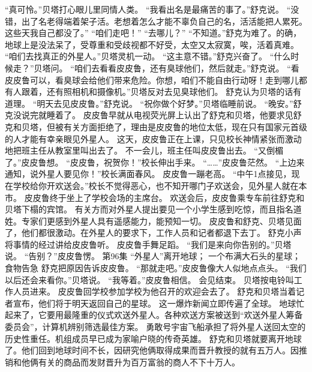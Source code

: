 \documentclass[a4paper,12pt,UTF8,twoside]{ctexbook}
\begin{document}
        “真可怜。”贝塔打心眼儿里同情人类。 
        “我看出名是最痛苦的事了。”舒克说。 
        “没错，出了名老得端着架子活。老想着怎么才能不辜负自己的名，活活能把人累死。这些天我自己都没了。” 
        “咱们走吧！” 
        “去哪儿？” 
        “不知道。”舒克为难了。的确，地球上是没法呆了，受尊重和受歧视都不好受，太空又太寂寞，唉，活着真难。 
        “咱们去找真正的外星人。”贝塔灵机一动。 
        “这主意不错。”舒克兴奋了。 
        “什么时候走？”贝塔问。 
        “咱们去看看皮皮鲁，还有臭球他们，然后就走。”舒克说。 
        “看皮皮鲁可以，看臭球会给他们带来危险。你想，咱们不能自由行动呀！走到哪儿都有人跟着，还有照相机和摄像机。”贝塔反对去见臭球他们。 
        舒克认为贝塔的话有道理。 
        “明天去见皮皮鲁。”舒克说。 
        “祝你做个好梦。”贝塔临睡前说。 
        “晚安。”舒克没说完就睡着了。 
        皮皮鲁早就从电视荧光屏上认出了舒克和贝塔，他要求见舒克和贝塔，但被有关方面拒绝了，理由是皮皮鲁的地位太低，现在只有国家元首级的人才能有幸亲眼见外星人。 
        这天，皮皮鲁正在上课，只见校长神情紧张而激动地把班主任从教室里叫出去了。 
        不一会儿，班主任叫皮皮鲁出去。 
        “又倒楣了。”皮皮鲁想。 
        “皮皮鲁，祝贺你！”校长伸出手来。 
        “……”皮皮鲁茫然。 
        “上边来通知，说外星人要见你！”校长满面春风。 
        皮皮鲁一蹦老高。 
        “中午1点接见，现在学校给你开欢送会。”校长不觉得恶心，也不知开哪门子欢送会，见外星人就在本市。 
        皮皮鲁终于坐上了学校会场的主席台。 
        欢送会后，皮皮鲁乘专车前往舒克和贝塔下榻的宾馆。 
        有关方而对外星人提出要见一个小学生感到吃惊，而且指名道姓。专家们更感到外星人具有遥感能力，能预知一切。 
        皮皮鲁和舒克、贝塔见面了，他们都很激动。在外星人的要求下，工作人员和记者都退下去丁。 
        舒克小声将事情的经过讲给皮皮鲁听。 
        皮皮鲁手舞足蹈。 
        “我们是来向你告别的。”贝塔说。 
        “告别？”皮皮鲁愣。   第96集 
        “外星人”离开地球； 
        一个布满大石头的星球； 
        食物告急   
        舒克把原因告诉皮皮鲁。 
        “那就走吧。”皮皮鲁像大人似地点点头。 
        “我们以后还会来看你。”贝塔说。 
        “我等着。”皮皮鲁相信。 
        会见结束。 
        贝塔按电铃叫工作人员进来。 
        皮皮鲁回学校参加学校为他召开的欢迎会去了。 
        舒克和贝塔当着记者宣布，他们将于明天返回自己的星球。 
        这一爆炸新闻立即传遍了全球。 
        地球忙起来了，它要用最隆重的仪式欢送外星人。各种欢送方案被送到“欢送外星人筹备委员会”，计算机辨别筛选最佳方案。 
        勇敢号宇宙飞船承担了将外星人送回太空的历史性重任。机组成员早已成为家喻户晓的传奇英雄。 
        舒克和贝塔就要离开地球了。他们回到地球时间不长，因研究他俩取得成果而晋升教授的就有五万人。因推销和他俩有关的商品而发财晋升为百万富翁的商人不下十万人。 
\end{document}
